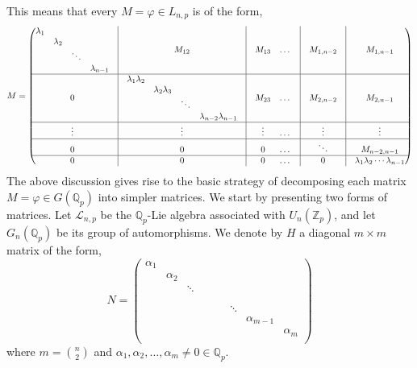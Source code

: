 \documentclass[12pt]{article}
\begin{document}
This means that every $M=\varphi\in L_{n,p}$ is of the form,$$M=\begin{pmatrix}
\begin{matrix}\lambda_1 & & &\\
& \lambda_2 & &\\
& & \ddots &\\
& & & \lambda_{n-1}\\
\end{matrix} & \vline & M_{12}&\vline & M_{13} & \dots& \vline & M_{1,n-2} & \vline&M_{1,n-1}\\
\hline
0 & \vline & \begin{matrix}\lambda_1\lambda_2 & & &\\
& \lambda_2\lambda_3 & &\\
& & \ddots &\\
& & & \lambda_{n-2}\lambda_{n-1}\\
\end{matrix}&\vline & M_{23} & \dots &\vline & M_{2,n-2} &\vline& M_{2,n-1}\\
\hline
\vdots & \vline & \vdots&\vline & \vdots & \dots &\vline & \vdots &\vline& \vdots\\
\hline
0 & \vline & 0&\vline & 0 & \dots &\vline & \ddots &\vline& M_{n-2,n-1}\\
\hline
0 & \vline & 0 &\vline & 0 & \dots &\vline & 0 &\vline& \lambda_1\lambda_2\cdots\lambda_{n-1}\\
\end{pmatrix}$$
The above discussion gives rise to the basic strategy of decomposing each matrix $M=\varphi\in G(
\mathbb{Q}_p)$ into simpler matrices.
We start by presenting two forms of matrices.
Let $\mathcal{L}_{n,p}$ be the $\mathbb{Q}_p$-Lie algebra associated with $U_n(\mathbb{Z}_p)$, and let $G_n(\mathbb{Q}_p)$ be its group of automorphisms. We denote by $H$ a diagonal $m\times m$ matrix of the form, \[N=\begin{pmatrix}
\alpha_1 & & & & & & & & \\
 &\alpha_2 & & & & & & & \\
 & & \ddots & & & & & & \\
& & & & & & & & \\
& & & & & & & & \\
 & & & & & & \ddots & & \\
 & & & & & & & \alpha_{m-1}& \\
 & & & & & & & & \alpha_m\\
\end{pmatrix}
\]
where $m=\binom{n}{2}$ and $\alpha_1,\alpha_2,\dots,\alpha_m\neq 0\in\mathbb{Q}_p$.
\end{document}
